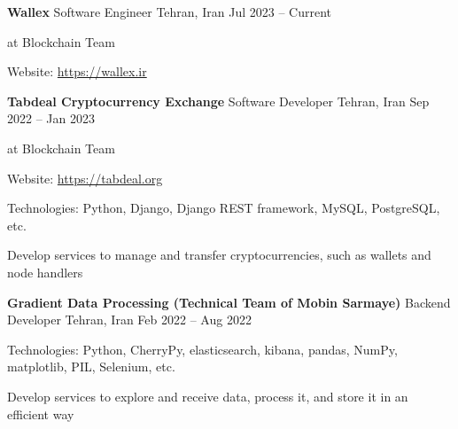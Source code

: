 \documentclass[]{awesome-cv}
\begin{document}
\vspace{-7mm}
\begin{cventries}
	\cventry
	{\textbf{Wallex}}
	{Software Engineer}
	{Tehran, Iran}
	{Jul 2023 – Current}
	{\begin{cvitems}
		\vspace{1mm}
		\item[] {\hspace{-9mm}} at Blockchain Team
		\vspace{1mm}
		\item[] {\hspace{-9mm} Website: \href{https://wallex.ir}{\textcolor{awesome}{https://wallex.ir}}}
	\end{cvitems}}
	\cventry
	{\textbf{Tabdeal Cryptocurrency Exchange}}
	{Software Developer}
	{Tehran, Iran}
	{Sep 2022 – Jan 2023}
	{\begin{cvitems}
		\vspace{1mm}
		\item[] {\hspace{-9mm}} at Blockchain Team
		\vspace{1mm}
		\item[] {\hspace{-9mm} Website: \href{https://tabdeal.org}{\textcolor{awesome}{https://tabdeal.org}}}
		\vspace{1mm}
		\item {Technologies: Python, Django, Django REST framework, MySQL, PostgreSQL, etc.}
		\vspace{1mm}
		\item {Develop services to manage and transfer cryptocurrencies, such as wallets and node handlers}
	\end{cvitems}}
	\cventry
	{\textbf{Gradient Data Processing (Technical Team of Mobin Sarmaye)}}
	{Backend Developer}
	{Tehran, Iran}
	{Feb 2022 – Aug 2022}
	{\begin{cvitems}
		\vspace{1mm}
		\item {Technologies: Python, CherryPy, elasticsearch, kibana, pandas, NumPy, matplotlib, PIL, Selenium, etc.}
		\vspace{1mm}
		\item {Develop services to explore and receive data, process it, and store it in an efficient way}

\end{cvitems}}
\end{cventries}
\end{document}
